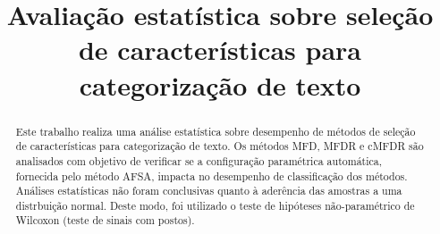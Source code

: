 \documentclass[conference]{IEEEtran}
\begin{document}
%
\title{\vspace{0.25in}Avaliação estatística sobre seleção de características para categorização de texto}



\author{
}

\maketitle

\begin{abstract}
Este trabalho realiza uma análise estatística sobre desempenho de métodos de seleção de características para categorização de texto. Os métodos MFD, MFDR e cMFDR são analisados com objetivo de verificar se a configuração paramétrica automática, fornecida pelo método AFSA, impacta no desempenho de classificação dos métodos. Análises estatísticas não foram conclusivas quanto à aderência das amostras a uma distrbuição normal. Deste modo, foi utilizado o teste de hipóteses não-paramétrico de Wilcoxon (teste de sinais com postos).
\end{abstract}

\IEEEpeerreviewmaketitle

\end{document}
